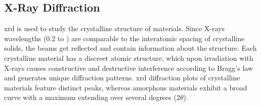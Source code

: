 

\subsection{X-Ray Diffraction}
\gls{xrd} is used to study the crystalline structure of materials.
Since X-rays wavelengths (\num{0.2} to ) are comparable to the interatomic spacing of crystalline solids, 
the beams get reflected and contain information about the structure\cite{Kaliva2020}.
Each crystalline material has a discreet atomic structure, which upon irradiation with 
X-rays causes constructive and destructive interference according to Bragg's law and generates unique diffraction patterns. 
\Gls{xrd} diffraction plots of crystalline materials feature distinct peaks, whereas amorphous materials exhibit a broad curve with a maximum extending over several degrees (2$\theta$).


